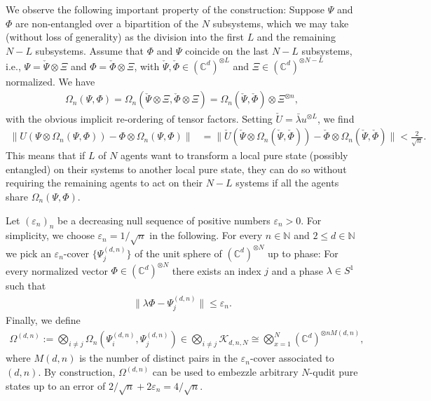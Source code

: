 \documentclass[a4paper, 10pt, onecolumn, accepted=2025-07-22]{quantumarticle}
\theoremstyle{definition}
\newcommand{\norm}[1]{\lVert #1\rVert}
\newcommand{\ox}{\otimes}
\newcommand{\eps}{\varepsilon}
\def\CC{{\mathbb C}}
\def\K{{\mathcal K}}
\def\NN{{\mathbb N}}
\newcommand*{\1}{\text{\usefont{U}{bbold}{m}{n}1}}
\begin{document}
We observe the following important property of the construction: Suppose $\Psi$ and $\Phi$ are non-entangled over a bipartition of the $N$ subsystems, which we may take (without loss of generality) as the division into the first $L$ and the remaining $N-L$ subsystems. Assume that $\Phi$ and $\Psi$ coincide on the  last $N-L$ subsystems, i.e.,  $\Psi = \check\Psi\ox \Xi$ and $\Phi = \check\Phi \ox \Xi$, with $\check\Psi,\check\Phi \in (\CC^d)^{\otimes L}$ and $\Xi\in (\CC^d)^{\ox N-L}$ normalized.
We have
\begin{align}
    \Omega_n(\Psi,\Phi)=\Omega_n(\check\Psi\ox\Xi,\check\Phi\ox \Xi) = \Omega_n(\check\Psi,\check\Phi)\ox \Xi^{\otimes n},
\end{align}
with the obvious implicit re-ordering of tensor factors.
Setting $\check U = \bar\lambda u^{\ox L}$, we find
\begin{align}\label{eq:multipartite-local-mbz-property}
   \norm{U (\Psi\ox\Omega_n(\Psi,\Phi))-\Phi\ox\Omega_n(\Psi,\Phi)} & = \norm{\check U(\check\Psi \ox\Omega_n(\check\Psi,\check\Phi))-\check\Phi\ox\Omega_n(\check\Psi,\check\Phi)}<\frac{2}{\sqrt{n}}.
\end{align}
This means that if $L$ of $N$ agents want to transform a local pure state (possibly entangled) on their systems to another local pure state, they can do so without requiring the remaining agents to act on their $N-L$ systems if all the agents share $\Omega_n(\Psi,\Phi)$. 

Let $(\eps_n)_n$ be a decreasing null sequence of positive numbers $\eps_n>0$.
For simplicity, we choose $\varepsilon_n = 1/\sqrt{n}$ in the following. 
For every $n\in\NN$ and $2\leq d\in \NN$ we pick an $\varepsilon_n$-cover $\{\Psi_j^{(d,n)}\}$ of the unit sphere of $(\CC^d)^{\otimes N}$ up to phase: 
For every normalized vector $\Phi \in (\CC^d)^{\otimes N}$ there exists an index $j$ and a phase $\lambda\in S^1$ such that
\begin{align}
    \norm{\lambda \Phi - \Psi_j^{(d,n)}} \leq \eps_n.
\end{align}
Finally, we define
\begin{align}
    \Omega^{(d,n)}:= \bigotimes_{i\neq j} \Omega_n(\Psi_i^{(d,n)},\Psi_j^{(d,n)}) \in \bigotimes_{i\neq j} \K_{d,n,N}\cong \bigotimes_{x=1}^N (\CC^d)^{\otimes nM(d,n)},
\end{align}
where $M(d,n)$ is the number of distinct pairs in the $\eps_n$-cover associated to $(d,n)$.
By construction, $\Omega^{(d,n)}$ can be used to embezzle arbitrary $N$-qudit pure states up to an error of $2/\sqrt{n}+2\eps_n = 4/\sqrt n$.
\end{document}

